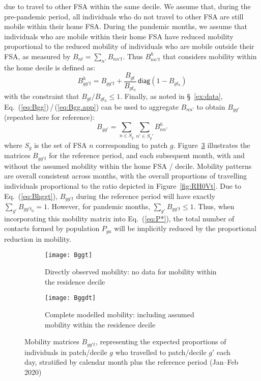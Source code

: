 due to travel to other FSA within the same decile.
We assume that, during the pre-pandemic period,
all individuals who do not travel to other FSA are still mobile within their home FSA.
During the pandemic months, we assume that
individuals who are mobile within their home FSA have reduced mobility
proportional to the reduced mobility of individuals who are mobile outside their FSA,
as measured by $B_{nt} = \sum_{n'} B_{nn't}$.
Thus $B^h_{nn't}$ that considers mobility within the home decile is defined as:
\begin{equation}\label{eq:Bhggt}
  B^h_{gg't} = B_{gg't} + \frac{B_{gt}}{B_{gt_0}} \,\textsf{diag}\left( 1 - B_{gt_0} \right)
\end{equation}
with the constraint that $B_{gt} / B_{gt_0} \le 1$.
Finally, as noted in \S~\ref{ex:data}, Eq.~(\ref{eq:Bgg})\,/\,(\ref{eq:Bgg.app})
can be used to aggregate $B_{nn'}$ to obtain $B_{gg'}$ (repeated here for reference):
\begin{equation}\label{eq:Bgg.app}
  B_{gg'} = \sum_{n \in S_g}\sum_{n' \in S_g'} B^h_{nn'}
\end{equation}
where $S_{g}$ is the set of FSA $n$ corresponding to patch $g$.
Figure~\ref{fig:Bggt} illustrates the matrices $B_{gg't}$
for the reference period, and each subsequent month,
with and without the assumed mobility within the home FSA / decile.
Mobility patterns are overall consistent across months,
with the overall proportions of travelling individuals
proportional to the ratio depicted in Figure~\ref{fig:RH0Vt}.
Due to Eq.~(\ref{eq:Bhggt}), $B_{gg't}$ during the reference period will have
exactly $\sum_{g'} B_{gg't_0} = 1$.
However, for pandemic months, $\sum_{g'} B_{gg't} \le 1$.
Thus, when incorporating this mobility matrix into Eq.~(\ref{eq:P*}),
the total number of contacts formed by population $P_{ga}$ will be implicitly reduced
by the proportional reduction in mobility.
\begin{figure}[ht]
  \centering
  \begin{subfigure}{\linewidth}
    \texttt{[image: Bggt]}
    \caption{Directly observed mobility: no data for mobility within the residence decile}
    \label{fig:Bggot}
  \end{subfigure}
  \begin{subfigure}{\linewidth}
    \texttt{[image: Bggdt]}
    \caption{Complete modelled mobility: including assumed mobility within the residence decile}
    \label{fig:Bggdt}
  \end{subfigure}
  \caption{Mobility matrices $B_{gg't}$, representing the expected proportions of individuals
    in patch/decile $g$ who travelled to patch/decile $g'$ each day,
    stratified by calendar month plus the reference period (Jan--Feb 2020)}
  \label{fig:Bggt}
\end{figure}
\clearpage
